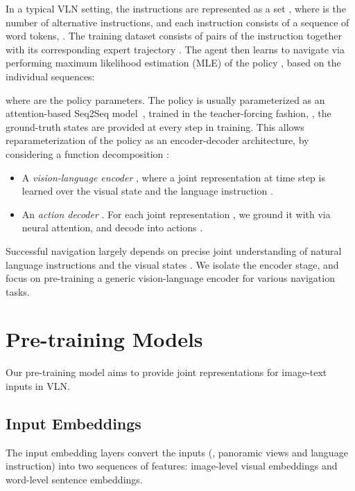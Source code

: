 \documentclass[10pt,twocolumn,letterpaper]{article}
\begin{document}
In a typical VLN setting, the instructions are represented as a set , where  is the number of alternative instructions, and each instruction  consists of a sequence of  word tokens, . 
The training dataset  consists of pairs of the instruction  together with its corresponding expert trajectory .
The agent then learns to navigate via performing maximum likelihood estimation (MLE) of the policy , based on the individual sequences: 

where  are the policy parameters. The policy is usually parameterized as an attention-based Seq2Seq model~\cite{anderson2018vision,fried2018speaker}, trained in the teacher-forcing fashion, \ie, the ground-truth states  are provided at every step in training. 
This allows reparameterization of the policy as an encoder-decoder architecture, by considering a function decomposition :
\begin{itemize}\item  A {\em vision-language encoder} , where a joint representation  at time step  is learned over the visual state  and the language instruction .
    \vspace{-4mm}
    \item An {\em action decoder} . For each joint representation , we ground it with  via neural attention, and decode into actions .
    \vspace{-2mm}
\end{itemize}

Successful navigation largely depends on precise joint understanding of natural language instructions and the visual states \cite{Thomason:19}. We isolate the encoder stage, and focus on pre-training a generic vision-language encoder for various navigation tasks. 






\section{Pre-training Models}
Our pre-training model aims to provide joint representations for image-text inputs in VLN.
\subsection{Input Embeddings}
The input embedding layers convert the inputs (\ie, panoramic views and language instruction) into two sequences of features:  image-level visual embeddings and word-level sentence embeddings.
\end{document}
